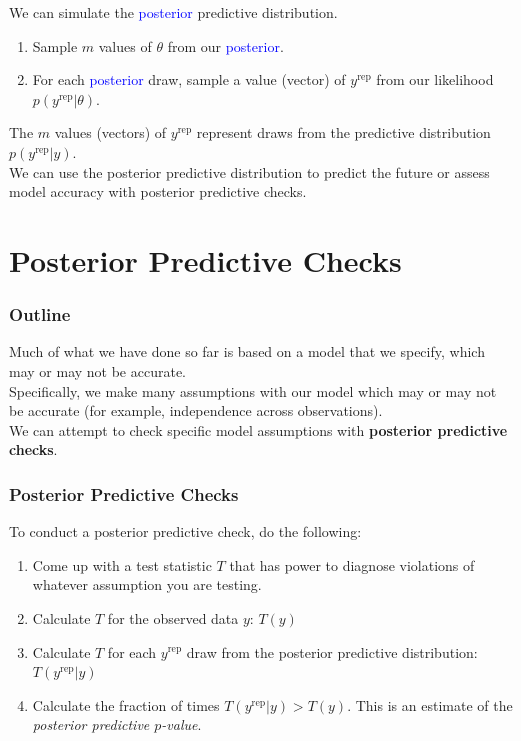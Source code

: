 \documentclass[handout]{beamer}
\begin{document}
\begin{frame}[fragile]
We can simulate the \textcolor{blue}{posterior} predictive distribution.
\pause
\bigskip
\begin{enumerate}
\item Sample $m$ values of $\theta$ from our \textcolor{blue}{posterior}.
\pause
\item For each \textcolor{blue}{posterior} draw, sample a value (vector) of
$y^{\mathrm{rep}}$ from our likelihood $p(y^{\mathrm{rep}} | \theta)$.
\end{enumerate}
\bigskip
\pause
The $m$ values (vectors) of $y^{\mathrm{rep}}$ represent draws from
the  predictive distribution $p(y^{\mathrm{rep}} | y)$.\\
\pause
\bigskip
We can use the posterior predictive distribution to predict the future
or assess model accuracy with posterior predictive checks.
\end{frame}

\section{Posterior Predictive Checks}

\begin{frame}
\frametitle{Outline}
\tableofcontents[currentsection]
\end{frame}

\begin{frame}
Much of what we have done so far is based on
a model that we specify, which may or may not be accurate. \\
\bigskip
\pause
Specifically, we make many assumptions with our model which may or may
not be accurate (for example, independence across observations). \\
\bigskip
\pause
We can attempt to check specific model assumptions with \textbf{posterior predictive checks}.
\end{frame}

\begin{frame}
\frametitle{Posterior Predictive Checks}
\pause
To conduct a posterior predictive check, do the following:
\medskip
\pause
\begin{enumerate}
\item Come up with a test statistic $T$ that has power to diagnose
violations of whatever assumption you are testing. 
\medskip
\pause
\item Calculate $T$ for the observed data $y$: \pause $T(y)$
\medskip
\pause
\item Calculate $T$ for each $y^{\mathrm{rep}}$ draw from the
posterior predictive distribution: \pause $T(y^{\mathrm{rep}} | y)$
\medskip
\pause
\item Calculate the fraction of times $T(y^{\mathrm{rep}} | y) >
T(y)$.  \pause  This is an estimate of the \textit{posterior
predictive $p$-value}. 
\end{enumerate}
\end{frame}
\end{document}
